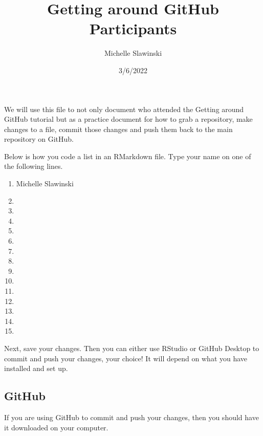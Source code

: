 \documentclass[
]{article}
\title{Getting around GitHub Participants}
\author{Michelle Slawinski}
\date{3/6/2022}
\providecommand{\tightlist}{%
  \setlength{\itemsep}{0pt}\setlength{\parskip}{0pt}}
\begin{document}
\maketitle

We will use this file to not only document who attended the Getting
around GitHub tutorial but as a practice document for how to grab a
repository, make changes to a file, commit those changes and push them
back to the main repository on GitHub.

Below is how you code a list in an RMarkdown file. Type your name on one
of the following lines.

\begin{enumerate}
\def\labelenumi{\arabic{enumi}.}
\tightlist
\item
  Michelle Slawinski
\item
\item
\item
\item
\item
\item
\item
\item
\item
\item
\item
\item
\item
\item
\end{enumerate}

Next, save your changes. Then you can either use RStudio or GitHub
Desktop to commit and push your changes, your choice! It will depend on
what you have installed and set up.

\hypertarget{github}{%
\subsection{GitHub}\label{github}}

If you are using GitHub to commit and push your changes, then you should
have it downloaded on your computer.
\end{document}
